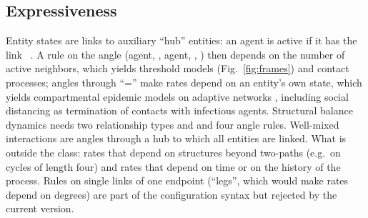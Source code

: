 \subsection{Expressiveness}\label{sec:expressiveness}
Entity states are links to auxiliary ``hub'' entities: an agent is active if it has the link ~.
A rule on the angle (agent, , agent, , ) then depends on the number of active neighbors, which yields threshold models \citep{granovetter1978,wiedermann2020} (Fig.~\ref{fig:frames}) and contact processes; angles through ``='' make rates depend on an entity's own state, which yields compartmental epidemic models on adaptive networks \citep{gross2006}, including social distancing as termination of contacts with infectious agents.
Structural balance dynamics \citep{heider1946,antal2005} needs two relationship types  and  and four angle rules.
Well-mixed interactions are angles through a hub to which all entities are linked.
What is outside the class: rates that depend on structures beyond two-paths (e.g.\ on cycles of length four) and rates that depend on time or on the history of the process.
Rules on single links of one endpoint (``legs'', which would make rates depend on degrees) are part of the configuration syntax but rejected by the current version.

